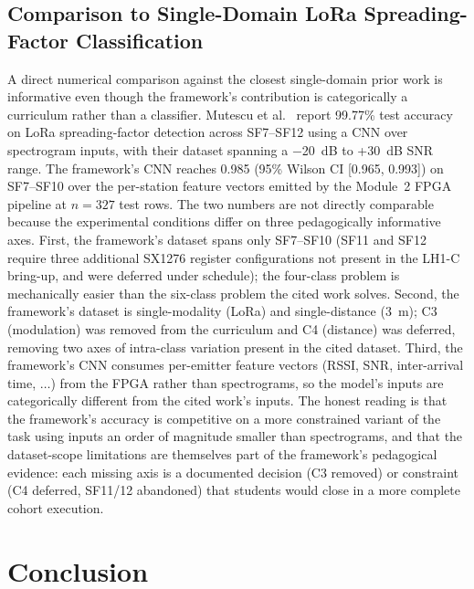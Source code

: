 \documentclass[conference]{IEEEtran}
\begin{document}
\subsection{Comparison to Single-Domain LoRa Spreading-Factor Classification}\label{sec:m4compare}

A direct numerical comparison against the closest single-domain prior work is informative even though the framework's contribution is categorically a curriculum rather than a classifier. Mutescu et al.~\cite{b5} report 99.77\% test accuracy on LoRa spreading-factor detection across SF7--SF12 using a CNN over spectrogram inputs, with their dataset spanning a $-$20~dB to +30~dB SNR range. The framework's CNN reaches 0.985 (95\% Wilson CI [0.965, 0.993]) on SF7--SF10 over the per-station feature vectors emitted by the Module~2 FPGA pipeline at $n=327$ test rows. The two numbers are not directly comparable because the experimental conditions differ on three pedagogically informative axes. First, the framework's dataset spans only SF7--SF10 (SF11 and SF12 require three additional SX1276 register configurations not present in the LH1-C bring-up, and were deferred under schedule); the four-class problem is mechanically easier than the six-class problem the cited work solves. Second, the framework's dataset is single-modality (LoRa) and single-distance (3~m); C3 (modulation) was removed from the curriculum and C4 (distance) was deferred, removing two axes of intra-class variation present in the cited dataset. Third, the framework's CNN consumes per-emitter feature vectors (RSSI, SNR, inter-arrival time, $\ldots$) from the FPGA rather than spectrograms, so the model's inputs are categorically different from the cited work's inputs. The honest reading is that the framework's accuracy is competitive on a more constrained variant of the task using inputs an order of magnitude smaller than spectrograms, and that the dataset-scope limitations are themselves part of the framework's pedagogical evidence: each missing axis is a documented decision (C3 removed) or constraint (C4 deferred, SF11/12 abandoned) that students would close in a more complete cohort execution.


\section{Conclusion}\label{sec:conclusion}
\end{document}
